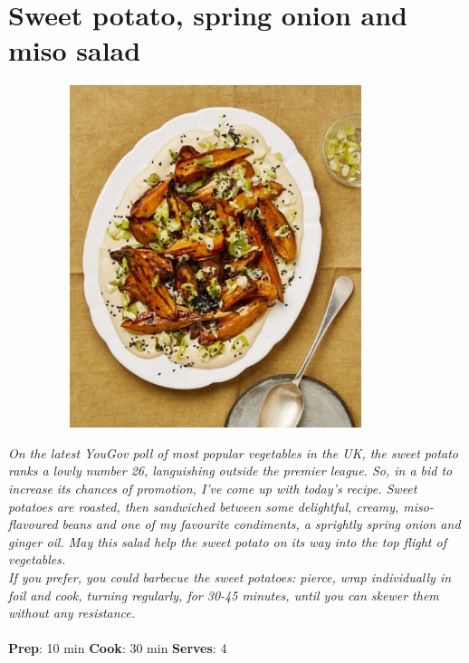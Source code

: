\documentclass{book}
\begin{document}
\section{Sweet potato, spring onion and miso salad}
\begin{figure}
\centering\includegraphics[width=10cm,height=10cm,keepaspectratio]{Recipe_Pictures/Sweet_potato,_spring_onion_and_miso_salad.png}
\end{figure}
\emph{On the latest YouGov poll of most popular vegetables in the UK, the sweet potato ranks a lowly number 26, languishing outside the premier league. So, in a bid to increase its chances of promotion, I’ve come up with today’s recipe. Sweet potatoes are roasted, then sandwiched between some delightful, creamy, miso-flavoured beans and one of my favourite condiments, a sprightly spring onion and ginger oil. May this salad help the sweet potato on its way into the top flight of vegetables.\\ 
If you prefer, you could barbecue the sweet potatoes: pierce, wrap individually in foil and cook, turning regularly, for 30-45 minutes, until you can skewer them without any resistance.}\\\\ 
\textbf{Prep}: 10 min
\textbf{Cook}: 30 min
\textbf{Serves}: 4
\end{document}
